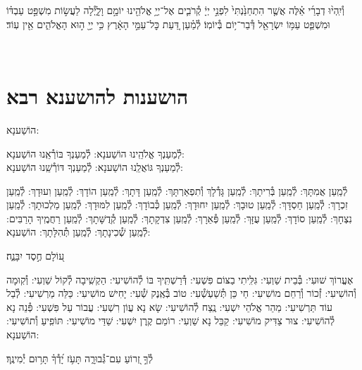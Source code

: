 \documentclass[twoside, openany, parskip=half, 11pt]{book}
\begin{document}
וְ֯יִֽהְי֨וּ דְבָרַ֜י אֵ֗לֶּה אֲשֶׁ֤ר הִתְחַנַּ֙נְתִּי֙ לִפְנֵ֣י יְיָ֔ קְ֯רֹבִ֛ים אֶל־יְיָ֥ אֱלֹהֵ֖ינוּ יוֹמָ֣ם וָלָ֑יְ֯לָה לַעֲשׂ֣וֹת מִשְׁפַּ֣ט עַבְדּ֗וֹ וּמִשְׁפַּ֛ט עַמּ֥וֹ יִשְׂרָאֵ֖ל דְּ֯בַר־י֥וֹם בְּ֯יוֹמֽוֹ׃ לְ֯מַ֗עַן דַּ֚עַת כׇּל־עַמֵּ֣י הָאָ֔רֶץ כִּ֥י יְיָ֖ ה֣וּא הָאֱלֹהִ֑ים אֵ֖ין עֽוֹד׃

\vfill
{}\\

\clearpage

\vspace{-1\baselineskip}
\section[הושענות להושענא רבא]{ הושענות להושענא רבא }

\begin{Large}
הוֹשַׁענָא:
\end{Large}


לְ֯מַעַנְךָ אֱלֹהֵֽינוּ הוֹשַׁענָא: לְ֯מַעַנְךָ בּוֹרְ֯אֵֽנוּ הוֹשַׁענָא:\\
לְ֯מַעַנְךָ גּוֹאֲלֵֽנוּ הוֹשַׁענָא: לְ֯מַעַנְךָ דּוֹרְ֯שֵֽׁנוּ הוֹשַׁענָא:

לְ֯מַֽעַן אֲמִתָּךְ: לְ֯מַֽעַן בְּ֯רִיתָךְ: לְ֯מַֽעַן גָּדְ֯לָךְ וְ֯תִפְאַרְתָּךְ: לְ֯מַֽעַן דָּתָךְ: לְ֯מַֽעַן הוֹדָךְ: לְ֯מַֽעַן וִעוּדָךְ: לְ֯מַֽעַן זִכְרָךְ: לְ֯מַֽעַן חַסְדָּךְ: לְ֯מַֽעַן טוּבָךְ: לְ֯מַֽעַן יִחוּדָךְ: לְ֯מַֽעַן כְּ֯בוֹדָךְ: לְ֯מַֽעַן לִמּוּדָךְ: לְ֯מַֽעַן מַלְכוּתָךְ: לְ֯מַֽעַן נִצְחָךְ: לְ֯מַֽעַן סוֹדָךְ: לְ֯מַֽעַן עֻזָּךְ: לְ֯מַֽעַן פְּ֯אֵרָךְ: לְ֯מַֽעַן צִדְקָתָךְ: לְ֯מַֽעַן קְ֯דֻשָּׁתָךְ: לְ֯מַֽעַן רַחֲמֶֽיךָ הָרַבִּים:
לְ֯מַֽעַן שְׁ֯כִינָתָךְ:
לְ֯מַֽעַן תְּ֯הִלָּתָךְ: הוֹשַׁענָא:

ע֭וֹלָם חֶ֣סֶד יִבָּנֶ֑ה׃

אֶעֱרוֹךְ שׁוּעִי: בְּ֯בֵית שַׁוְעִי: גִּלִּֽיתִי בַצּוֹם פִּשְׁעִי: דְּ֯רַשְׁתִּֽיךָ בּוֹ לְ֯הוֹשִׁיעִי: הַקְשִֽׁיבָה לְ֯קוֹל שַׁוְעִי: וְ֯קֽוּמָה וְ֯הוֹשִׁיעִי: זְ֯כוֹר וְ֯רַחֵם מוֹשִׁיעִי: חַי כֵּן תְּ֯שַׁעְשְׁ֯עִי: טוֹב בְּ֯אֶֽנֶק שְׁ֯עִי: יָחִישׁ מוֹשִׁיעִי: כַּלֵּה מַרְשִׁיעִי: לְ֯בַל עוֹד תַּרְשִׁיעִי: מַהֵר אֱלֹהֵי יִשְׁעִי: נֶֽצַח לְ֯הוֹשִׁיעִי: שָׂא נָא עֲוֹן רִשְׁעִי: עֲבוֹר עַל פִּשְׁעִי: פְּ֯נֵה נָא לְ֯הוֹשִׁיעִי: צוּר צַדִּיק מוֹשִׁיעִי: קַבֵּל נָא שַׁוְעִי: רוֹמֵם קֶֽרֶן יִשְׁעִי:
שַׁדַּי מוֹשִׁיעִי:
תּוֹפִֽיעַ וְ֯תוֹשִׁיעִי: הוֹשַׁענָא:

לְ֯ךָ֣ זְ֭רוֹעַ עִם־גְּ֯בוּרָ֑ה תָּעֹ֥ז יָ֝דְ֯ךָ֗ תָּר֥וּם יְ֯מִינֶֽךָ׃
\end{document}
